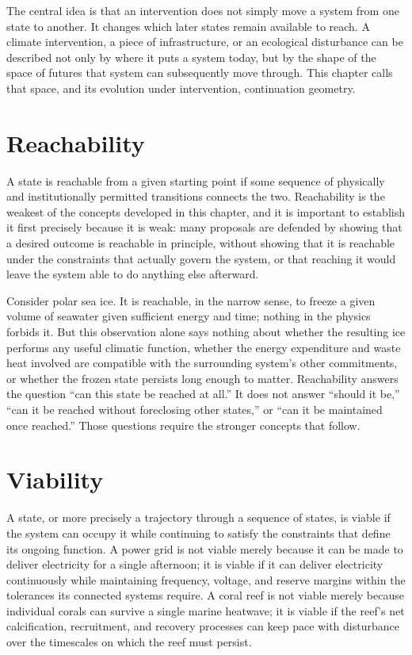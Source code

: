 \documentclass[11pt,oneside]{book}
\begin{document}
The central idea is that an intervention does not simply move a system from one state to another. It changes which later states remain available to reach. A climate intervention, a piece of infrastructure, or an ecological disturbance can be described not only by where it puts a system today, but by the shape of the space of futures that system can subsequently move through. This chapter calls that space, and its evolution under intervention, continuation geometry.

\section*{Reachability}

A state is reachable from a given starting point if some sequence of physically and institutionally permitted transitions connects the two. Reachability is the weakest of the concepts developed in this chapter, and it is important to establish it first precisely because it is weak: many proposals are defended by showing that a desired outcome is reachable in principle, without showing that it is reachable under the constraints that actually govern the system, or that reaching it would leave the system able to do anything else afterward.

Consider polar sea ice. It is reachable, in the narrow sense, to freeze a given volume of seawater given sufficient energy and time; nothing in the physics forbids it. But this observation alone says nothing about whether the resulting ice performs any useful climatic function, whether the energy expenditure and waste heat involved are compatible with the surrounding system's other commitments, or whether the frozen state persists long enough to matter. Reachability answers the question ``can this state be reached at all.'' It does not answer ``should it be,'' ``can it be reached without foreclosing other states,'' or ``can it be maintained once reached.'' Those questions require the stronger concepts that follow.

\section*{Viability}

A state, or more precisely a trajectory through a sequence of states, is viable if the system can occupy it while continuing to satisfy the constraints that define its ongoing function. A power grid is not viable merely because it can be made to deliver electricity for a single afternoon; it is viable if it can deliver electricity continuously while maintaining frequency, voltage, and reserve margins within the tolerances its connected systems require. A coral reef is not viable merely because individual corals can survive a single marine heatwave; it is viable if the reef's net calcification, recruitment, and recovery processes can keep pace with disturbance over the timescales on which the reef must persist.
\end{document}
